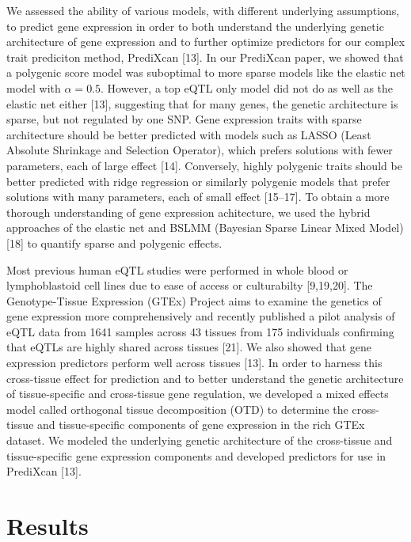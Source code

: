 \documentclass[]{article}
\begin{document}
We assessed the ability of various models, with different underlying
assumptions, to predict gene expression in order to both understand the
underlying genetic architecture of gene expression and to further
optimize predictors for our complex trait prediciton method, PrediXcan
{[}13{]}. In our PrediXcan paper, we showed that a polygenic score model
was suboptimal to more sparse models like the elastic net model with
\(\alpha=0.5\). However, a top eQTL only model did not do as well as the
elastic net either {[}13{]}, suggesting that for many genes, the genetic
architecture is sparse, but not regulated by one SNP. Gene expression
traits with sparse architecture should be better predicted with models
such as LASSO (Least Absolute Shrinkage and Selection Operator), which
prefers solutions with fewer parameters, each of large effect {[}14{]}.
Conversely, highly polygenic traits should be better predicted with
ridge regression or similarly polygenic models that prefer solutions
with many parameters, each of small effect {[}15--17{]}. To obtain a
more thorough understanding of gene expression achitecture, we used the
hybrid approaches of the elastic net and BSLMM (Bayesian Sparse Linear
Mixed Model) {[}18{]} to quantify sparse and polygenic effects.

Most previous human eQTL studies were performed in whole blood or
lymphoblastoid cell lines due to ease of access or culturabilty
{[}9,19,20{]}. The Genotype-Tissue Expression (GTEx) Project aims to
examine the genetics of gene expression more comprehensively and
recently published a pilot analysis of eQTL data from 1641 samples
across 43 tissues from 175 individuals confirming that eQTLs are highly
shared across tissues {[}21{]}. We also showed that gene expression
predictors perform well across tissues {[}13{]}. In order to harness
this cross-tissue effect for prediction and to better understand the
genetic architecture of tissue-specific and cross-tissue gene
regulation, we developed a mixed effects model called orthogonal tissue
decomposition (OTD) to determine the cross-tissue and tissue-specific
components of gene expression in the rich GTEx dataset. We modeled the
underlying genetic architecture of the cross-tissue and tissue-specific
gene expression components and developed predictors for use in PrediXcan
{[}13{]}.

\section{Results}\label{results}
\end{document}
